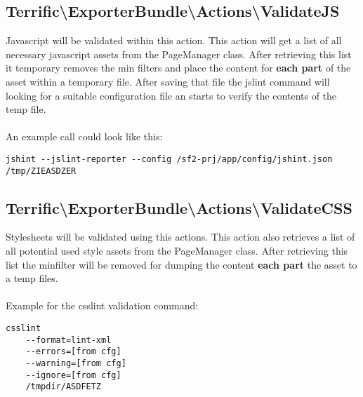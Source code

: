 \noindent \begin{minipage}{\textwidth}
\vspace{1.5em}
\hypertarget{sec-Actions-ValidateJS}{\subsection{Terrific\textnormal{\textbackslash}ExporterBundle\textnormal{\textbackslash}Actions\textnormal{\textbackslash}ValidateJS}}
Javascript will be validated within this action. This action will get a list of all necessary javascript assets from the PageManager class. After retrieving this list it temporary removes the min filters and place the content for \textbf{each part} of the asset within a temporary file. After saving that file the jslint command will looking for a suitable configuration file an starts to verify the contents of the temp file. \\
\\
An example call could look like this:
\begin{verbatim}
jshint --jslint-reporter --config /sf2-prj/app/config/jshint.json /tmp/ZIEASDZER
\end{verbatim}
\end{minipage}


\noindent \begin{minipage}{\textwidth}
\vspace{1.5em}
\hypertarget{sec-Actions-ValidateCSS}{\subsection{Terrific\textnormal{\textbackslash}ExporterBundle\textnormal{\textbackslash}Actions\textnormal{\textbackslash}ValidateCSS}}
Stylesheets will be validated using this actions. This action also retrieves a list of all potential used style assets from the PageManager class. After retrieving this list the minfilter will be removed for dumping the content \textbf{each part} the asset to a temp files.\\
\\
Example for the csslint validation command:
\begin{verbatim}
csslint
    --format=lint-xml
    --errors=[from cfg]
    --warning=[from cfg]
    --ignore=[from cfg]
    /tmpdir/ASDFETZ
\end{verbatim}
\end{minipage}

